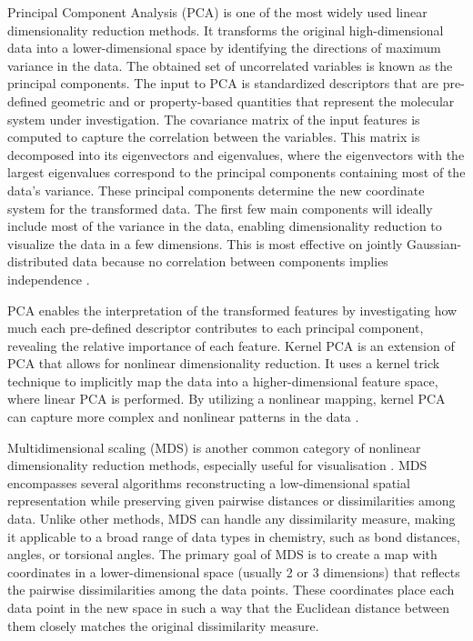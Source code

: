 \documentclass[9pt,bestpractices]{livecoms}
\begin{document}
Principal Component Analysis (PCA) is one of the most widely used linear dimensionality reduction methods. It transforms the original high-dimensional data into a lower-dimensional space by identifying the directions of maximum variance in the data. The obtained set of uncorrelated variables is known as the principal components. The input to PCA is standardized descriptors that are pre-defined geometric and or property-based quantities that represent the molecular system under investigation. The covariance matrix of the input features is computed to capture the correlation between the variables. This matrix is decomposed into its eigenvectors and eigenvalues, where the eigenvectors with the largest eigenvalues correspond to the principal components containing most of the data's variance. These principal components determine the new coordinate system for the transformed data. The first few main components will ideally include most of the variance in the data, enabling dimensionality reduction to visualize the data in a few dimensions. This is most effective on jointly Gaussian-distributed data because no correlation between components implies independence \cite{RN20}. 

PCA enables the interpretation of the transformed features by investigating how much each pre-defined descriptor contributes to each principal component, revealing the relative importance of each feature. Kernel PCA is an extension of PCA that allows for nonlinear dimensionality reduction. It uses a kernel trick technique to implicitly map the data into a higher-dimensional feature space, where linear PCA is performed. By utilizing a nonlinear mapping, kernel PCA can capture more complex and nonlinear patterns in the data \cite{RN11}.

Multidimensional scaling (MDS) is another common category of nonlinear dimensionality reduction methods, especially useful for visualisation \cite{Mead1992ReviewMethods}. MDS encompasses several algorithms reconstructing a low-dimensional spatial representation while preserving given pairwise distances or dissimilarities among data. Unlike other methods, MDS can handle any dissimilarity measure, making it applicable to a broad range of data types in chemistry, such as bond distances, angles, or torsional angles. The primary goal of MDS is to create a map with coordinates in a lower-dimensional space (usually 2 or 3 dimensions) that reflects the pairwise dissimilarities among the data points. These coordinates place each data point in the new space in such a way that the Euclidean distance between them closely matches the original dissimilarity measure.
\end{document}
